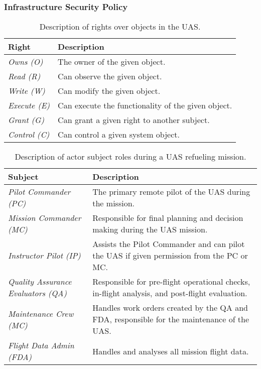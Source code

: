 \documentclass[10pt,journal,compsoc]{IEEEtran}
\begin{document}
\subsubsection{Infrastructure Security Policy}

\begin{table}[]
  \caption{Description of rights over objects in the UAS.}
  \begin{tabular}{ll}
  \hline
  \textbf{Right}       & \textbf{Description}                               \\ 
  \hline
  \textit{Owns (O)}    & The owner of the given object.                     \\
  \textit{Read (R)}    & Can observe the given object.                      \\
  \textit{Write (W)}   & Can modify the given object.                       \\
  \textit{Execute (E)} & Can execute the functionality of the given object. \\
  \textit{Grant (G)}   & Can grant a given right to another subject.        \\
  \textit{Control (C)} & Can control a given system object.                                                           \\
  \hline
  \end{tabular}
\end{table}

\begin{table*}[]
  \caption{Description of actor subject roles during a UAS refueling mission.}
  \begin{tabular}{ll}
  \hline
  \textbf{Subject}                           & \textbf{Description}                                                                                       \\ 
  \hline
  \textit{Pilot Commander (PC)}              & The primary remote pilot of the UAS during the mission.                                                    \\
  \textit{Mission Commander (MC)}            & Responsible for final planning and decision making during the UAS mission.                                 \\
  \textit{Instructor Pilot (IP)}             & Assists the Pilot Commander and can pilot the UAS if given permission from the PC or MC.                   \\
  \textit{Quality Assurance Evaluators (QA)} & Responsible for pre-flight operational checks, in-flight analysis, and post-flight evaluation.             \\
  \textit{Maintenance Crew (MC)}             & Handles work orders created by the QA and FDA, responsible for the maintenance of the UAS.                 \\
  \textit{Flight Data Admin (FDA)}           & Handles and analyses all mission flight data.                                                              \\
  \hline
  \end{tabular}
\end{table*}
\end{document}
